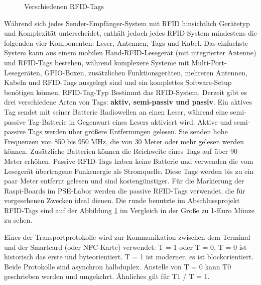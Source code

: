 \begin{figure}
	\caption{Verschiedenen RFID-Tags}
	\label{fig:tags}
\end{figure}
Während sich jedes Sender-Empfänger-System mit RFID hinsichtlich Gerätetyp und Komplexität unterscheidet, enthält jedoch jedes RFID-System mindestens die folgenden vier Komponenten: Leser, Antennen, Tags und Kabel. Das einfachste System kann aus einem mobilen Hand-RFID-Lesegerät (mit integrierter Antenne) und RFID-Tags bestehen, während komplexere Systeme mit Multi-Port-Lesegeräten, GPIO-Boxen, zusätzlichen Funktionsgeräten, mehreren Antennen, Kabeln und RFID-Tags ausgelegt sind und ein komplettes Software-Setup benötigen können. RFID-Tag-Typ Bestimmt das RFID-System. Derzeit gibt es drei verschiedene Arten von Tags: \textbf{aktiv, semi-passiv und passiv}. Ein aktives Tag sendet mit seiner Batterie Radiowellen an einen Leser, während eine semi-passive Tag-Batterie in Gegenwart eines Lesers aktiviert wird. Aktive und semi-passive Tags werden über größere Entfernungen gelesen. Sie senden hohe Frequenzen von 850 bis 950 MHz, die von 30 Meter oder mehr gelesen werden können. Zusätzliche Batterien können die Reichweite eines Tags auf über 90 Meter erhöhen. Passive RFID-Tags haben keine Batterie und verwenden die vom Lesegerät übertragene Funkenergie als Stromquelle. Diese Tags werden bis zu ein paar Meter entfernt gelesen und sind kostengünstiger. Für die Markierung der Raspi-Boards im PSE-Labor werden die passive RFID-Tags verwendet, die für vorgesehenen Zwecken ideal dienen. Die runde benutzte im Abschlussprojekt RFID-Tags sind auf der Abbildung \ref{fig:tags} im Vergleich in der Große zu 1-Euro Münze zu sehen.
	
Eines der Transportprotokolle wird zur Kommunikation zwischen dem Terminal und der Smartcard (oder NFC-Karte) verwendet: T = 1 oder T = 0. T = 0 ist historisch das erste und byteorientiert. T = 1 ist moderner, es ist blockorientiert. Beide Protokolle sind asynchron halbduplex. Anstelle von T = 0 kann T0 geschrieben werden und umgekehrt. Ähnliches gilt für T1 / T = 1. 

